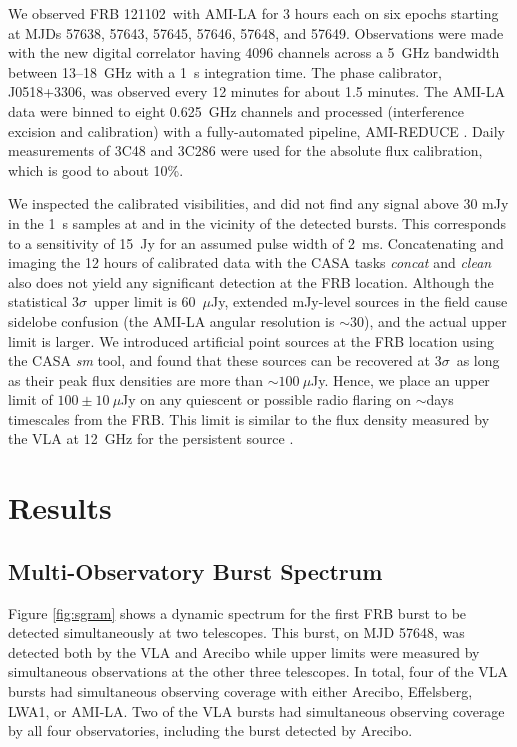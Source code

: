 \documentclass[twocolumn]{aastex61}
\newcommand{\frb}{FRB 121102}
\begin{document}
We observed \frb\ with AMI-LA for 3 hours each on six epochs starting at MJDs 57638, 57643, 57645, 57646, 57648, and 57649. Observations were made with the new digital correlator having 4096 channels across a 5~GHz bandwidth between 13--18~GHz with a 1~s integration time. The phase calibrator, J0518+3306, was observed every 12 minutes for about 1.5 minutes. The AMI-LA data were binned to eight 0.625~GHz channels and processed (interference excision and calibration) with a fully-automated pipeline, AMI-REDUCE \citep[e.g.,][]{2013MNRAS.429.3330P}. Daily measurements of 3C48 and 3C286 were used for the absolute flux calibration, which is good to about 10\%. 

We inspected the calibrated visibilities, and did not find any signal above 30 mJy in the 1~s samples at and in the vicinity of the detected bursts. This corresponds to a sensitivity of 15~Jy for an assumed pulse width of 2~ms. Concatenating and imaging the 12 hours of calibrated data with the CASA tasks {\it concat} and {\it clean} also does not yield any significant detection at the FRB location. Although the statistical $3\sigma$\ upper limit is 60~$\mu$Jy, extended mJy-level sources in the field cause sidelobe confusion (the AMI-LA angular resolution is $\sim$30\arcsec), and the actual upper limit is larger. We introduced artificial point sources at the FRB location using the CASA {\it sm} tool, and found that these sources can be recovered at $3\sigma$\ as long as their peak flux densities are more than $\sim100~\mu$Jy. Hence, we place an upper limit of $100\pm10~\mu$Jy on any quiescent or possible radio flaring on $\sim$days timescales from the FRB. This limit is similar to the flux density measured by the VLA at 12~GHz for the persistent source \citep{LOC}.

\section{Results}
\label{sec:res}

\subsection{Multi-Observatory Burst Spectrum}

Figure \ref{fig:sgram} shows a dynamic spectrum for the first FRB burst to be detected simultaneously at two telescopes. This burst, on MJD 57648, was detected both by the VLA and Arecibo while upper limits were measured by simultaneous observations at the other three telescopes. In total, four of the VLA bursts had simultaneous observing coverage with either Arecibo, Effelsberg, LWA1, or AMI-LA. Two of the VLA bursts had simultaneous observing coverage by all four observatories, including the burst detected by Arecibo.
\end{document}
